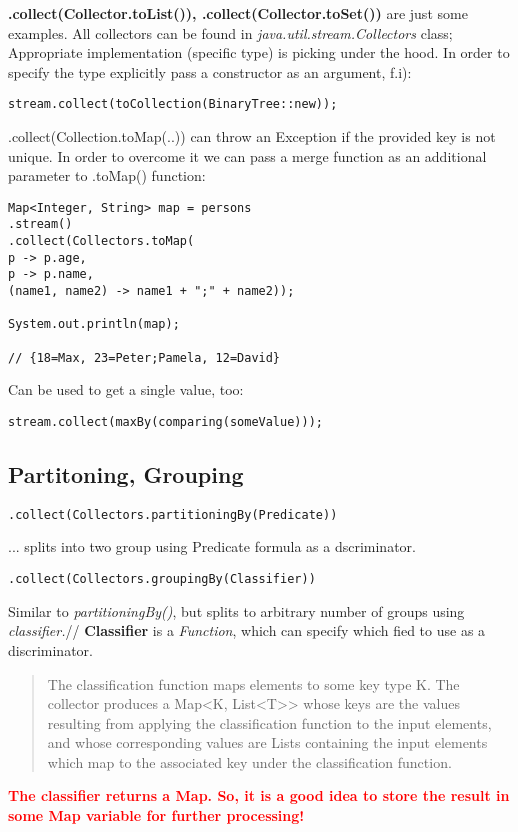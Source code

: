 \documentclass{report}
\begin{document}
\textbf{.collect(Collector.toList()), .collect(Collector.toSet())} are just some examples. All collectors can be found in \textit{java.util.stream.Collectors} class; Appropriate implementation (specific type) is picking under the hood. In order to specify the type explicitly pass a constructor as an argument, f.i):
\begin{verbatim}
stream.collect(toCollection(BinaryTree::new));
\end{verbatim}

.collect(Collection.toMap(..)) can throw an Exception if the provided key is not unique. In order to overcome it we can pass a merge function as an additional parameter to 
.toMap() function:
\begin{verbatim}
Map<Integer, String> map = persons
.stream()
.collect(Collectors.toMap(
p -> p.age,
p -> p.name,
(name1, name2) -> name1 + ";" + name2));

System.out.println(map);

// {18=Max, 23=Peter;Pamela, 12=David}
\end{verbatim}

Can be used to get a single value, too:
\begin{verbatim}
stream.collect(maxBy(comparing(someValue)));
\end{verbatim}

\subsection{Partitoning, Grouping}
\begin{verbatim}
.collect(Collectors.partitioningBy(Predicate))
\end{verbatim}
... splits into two group using Predicate formula as a dscriminator.
\\
\begin{verbatim}
.collect(Collectors.groupingBy(Classifier))
\end{verbatim}
Similar to \textit{partitioningBy()}, but splits to arbitrary number of groups using \textit{classifier.}//
\textbf{Classifier} is a \textit{Function}, which can specify which fied to use as a discriminator.
\begin{quote}
	The classification function maps elements to some key type K. The collector produces a Map<K, List<T>> whose keys are the values resulting from applying the classification function to the input elements, and whose corresponding values are Lists containing the input elements which map to the associated key under the classification function.
\end{quote}
\textbf{\textcolor{red}{The classifier returns a Map. So, it is a good idea to store the result in some Map variable for further processing!}}
\end{document}

